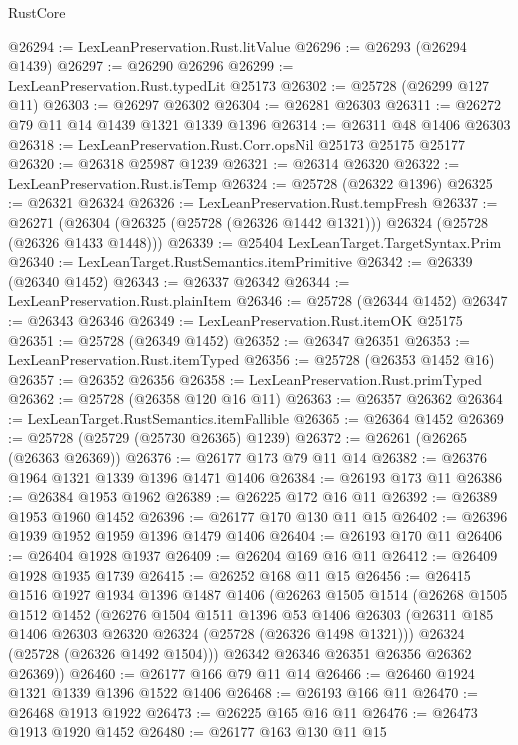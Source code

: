 \begin{lexlean}{RustCore}
\begin{coremodule}
@26294 := LexLeanPreservation.Rust.litValue
@26296 := @26293 (@26294 @1439)
@26297 := @26290 @26296
@26299 := LexLeanPreservation.Rust.typedLit @25173
@26302 := @25728 (@26299 @127 @11)
@26303 := @26297 @26302
@26304 := @26281 @26303
@26311 := @26272 @79 @11 @14 @1439 @1321 @1339 @1396
@26314 := @26311 @48 @1406 @26303
@26318 := LexLeanPreservation.Rust.Corr.opsNil @25173 @25175 @25177
@26320 := @26318 @25987 @1239
@26321 := @26314 @26320
@26322 := LexLeanPreservation.Rust.isTemp
@26324 := @25728 (@26322 @1396)
@26325 := @26321 @26324
@26326 := LexLeanPreservation.Rust.tempFresh
@26337 := @26271
    (@26304 (@26325 (@25728 (@26326 @1442 @1321))) @26324 (@25728 (@26326 @1433 @1448)))
@26339 := @25404 LexLeanTarget.TargetSyntax.Prim
@26340 := LexLeanTarget.RustSemantics.itemPrimitive
@26342 := @26339 (@26340 @1452)
@26343 := @26337 @26342
@26344 := LexLeanPreservation.Rust.plainItem
@26346 := @25728 (@26344 @1452)
@26347 := @26343 @26346
@26349 := LexLeanPreservation.Rust.itemOK @25175
@26351 := @25728 (@26349 @1452)
@26352 := @26347 @26351
@26353 := LexLeanPreservation.Rust.itemTyped
@26356 := @25728 (@26353 @1452 @16)
@26357 := @26352 @26356
@26358 := LexLeanPreservation.Rust.primTyped
@26362 := @25728 (@26358 @120 @16 @11)
@26363 := @26357 @26362
@26364 := LexLeanTarget.RustSemantics.itemFallible
@26365 := @26364 @1452
@26369 := @25728 (@25729 (@25730 @26365) @1239)
@26372 := @26261 (@26265 (@26363 @26369))
@26376 := @26177 @173 @79 @11 @14
@26382 := @26376 @1964 @1321 @1339 @1396 @1471 @1406
@26384 := @26193 @173 @11
@26386 := @26384 @1953 @1962
@26389 := @26225 @172 @16 @11
@26392 := @26389 @1953 @1960 @1452
@26396 := @26177 @170 @130 @11 @15
@26402 := @26396 @1939 @1952 @1959 @1396 @1479 @1406
@26404 := @26193 @170 @11
@26406 := @26404 @1928 @1937
@26409 := @26204 @169 @16 @11
@26412 := @26409 @1928 @1935 @1739
@26415 := @26252 @168 @11 @15
@26456 := @26415
    @1516
    @1927
    @1934
    @1396
    @1487
    @1406
    (@26263
      @1505
      @1514
      (@26268
        @1505
        @1512
        @1452
        (@26276
          @1504
          @1511
          @1396
          @53
          @1406
          @26303
          (@26311 @185 @1406 @26303 @26320 @26324 (@25728 (@26326 @1498 @1321)))
          @26324
          (@25728 (@26326 @1492 @1504)))
        @26342
        @26346
        @26351
        @26356
        @26362
        @26369))
@26460 := @26177 @166 @79 @11 @14
@26466 := @26460 @1924 @1321 @1339 @1396 @1522 @1406
@26468 := @26193 @166 @11
@26470 := @26468 @1913 @1922
@26473 := @26225 @165 @16 @11
@26476 := @26473 @1913 @1920 @1452
@26480 := @26177 @163 @130 @11 @15

\end{coremodule}
\end{lexlean}
